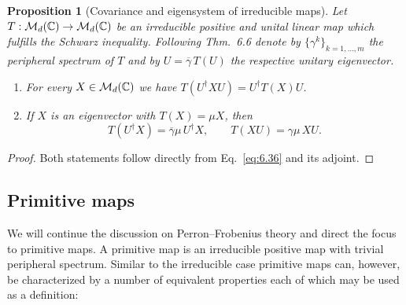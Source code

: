 \documentclass[11pt,a4paper]{article}
\theoremstyle{plain}
\newtheorem{proposition}{Proposition}[section]
\theoremstyle{definition}
\theoremstyle{remark}
\begin{document}
\begin{proposition}[Covariance and eigensystem of irreducible maps]
    Let $T:\mathcal{M}_d(\mathbb{C})\to\mathcal{M}_d(\mathbb{C})$ be an irreducible positive and unital linear map which
    fulfills the Schwarz inequality. Following Thm.~6.6 denote by $\{\gamma^k\}_{k=1,\dots,m}$
    the peripheral spectrum of $T$ and by $U=\overline{\gamma}\,T(U)$ the respective unitary
    eigenvector.
    \begin{enumerate}
        \item For every $X\in\mathcal{M}_d(\mathbb{C})$ we have $T(U^\dagger XU)=U^\dagger T(X)U$.
        \item If $X$ is an eigenvector with $T(X)=\mu X$, then
              \begin{equation}\tag{6.38}\label{eq:6.38}
                  T(U^\dagger X)=\overline{\gamma}\mu\,U^\dagger X,
                  \qquad
                  T(XU)=\gamma\mu\,XU.
              \end{equation}
    \end{enumerate}
\end{proposition}

\begin{proof}
    Both statements follow directly from Eq.~\eqref{eq:6.36} and its adjoint.
\end{proof}


\subsection{Primitive maps}

We will continue the discussion on Perron--Frobenius theory and direct the focus
to primitive maps. A primitive map is an irreducible positive map with trivial
peripheral spectrum. Similar to the irreducible case primitive maps can,
however, be characterized by a number of equivalent properties each of which
may be used as a definition:
\end{document}
